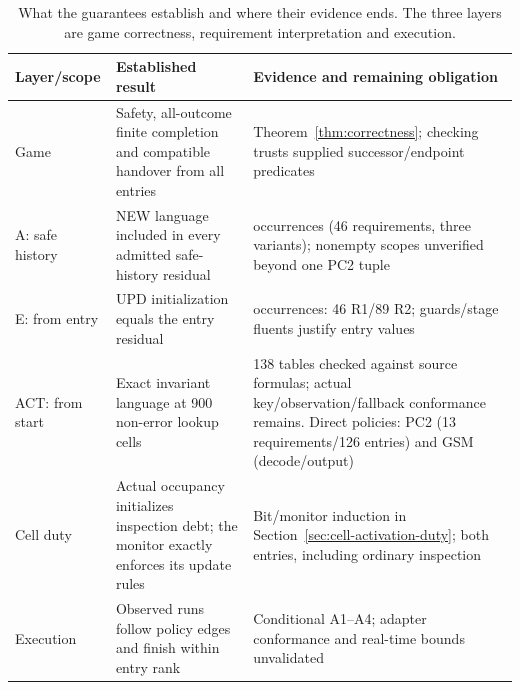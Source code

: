 \begin{table}[!htbp]
\caption{What the guarantees establish and where their evidence ends. The three layers are game correctness, requirement interpretation and execution.}
\label{tab:guarantee-evidence-detail}
\centering\small
\begin{tabular}{@{}p{.16\linewidth}p{.39\linewidth}p{.39\linewidth}@{}}\toprule
Layer/scope & Established result & Evidence and remaining obligation\\\midrule
Game & Safety, all-outcome finite completion and compatible handover from all entries & Theorem~\ref{thm:correctness}; checking trusts supplied successor/endpoint predicates\\
A: safe history & NEW language included in every admitted safe-history residual & \RSNewOccurrences{} occurrences (46 requirements, three variants); nonempty scopes unverified beyond one PC2 tuple\\
E: from entry & UPD initialization equals the entry residual & \VThreeRSUpdExact{} occurrences: 46 R1/89 R2; guards/stage fluents justify entry values\\
ACT: from start & Exact invariant language at 900 non-error lookup cells & 138 tables checked against source formulas; actual key/observation/fallback conformance remains. Direct policies: PC2 (13 requirements/126 entries) and GSM (decode/output)\\
Cell duty & Actual occupancy initializes inspection debt; the monitor exactly enforces its update rules & Bit/monitor induction in Section~\ref{sec:cell-activation-duty}; both entries, including ordinary inspection\\
Execution & Observed runs follow policy edges and finish within entry rank & Conditional A1--A4; adapter conformance and real-time bounds unvalidated\\\bottomrule
\end{tabular}
\par{}
\end{table}
